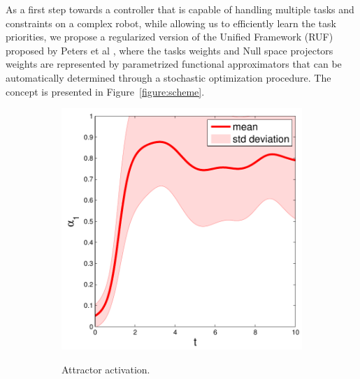 As a first step towards a controller that is capable of handling multiple tasks
and constraints on a complex robot, while allowing us to efficiently learn the
task priorities, we propose a regularized version of the Unified Framework (RUF)
proposed by Peters et al \cite{Peters_AR_2008}, where the tasks weights and
Null space projectors weights are represented by parametrized functional
approximators that can be automatically determined through a stochastic
optimization procedure. The concept is presented in Figure~\ref{figure:scheme}.

\begin{figure}%

\begin{subfigure}{.3\textwidth}
  \centering
  \includegraphics[width=1\linewidth]{./sections/WP4/pics_serena/alpha1}
  \label{fig:alpha1}
  \caption{Attractor activation.}
\end{subfigure}%
\begin{subfigure}{.3\textwidth}
  \centering

\end{subfigure}
\end{figure}
